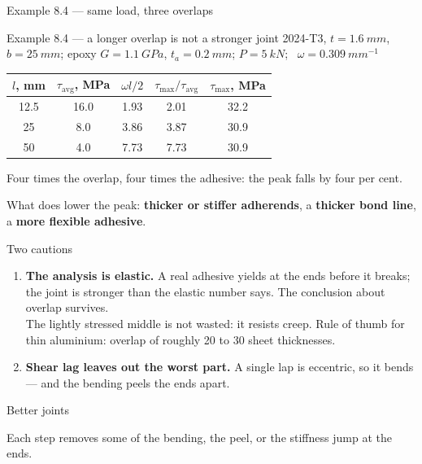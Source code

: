 \documentclass[aspectratio=169,10pt]{beamer}
\begin{document}
\begin{frame}{Example 8.4 --- same load, three overlaps}
\centering
\resizebox{!}{0.8\textheight}{}
\end{frame}

\begin{frame}{Example 8.4 --- a longer overlap is not a stronger joint}
\small 2024-T3, $t=\SI{1.6}{mm}$, $b=\SI{25}{mm}$; epoxy $G=\SI{1.1}{GPa}$, $t_a=\SI{0.2}{mm}$; $P=\SI{5}{kN}$; \ $\omega=\SI{0.309}{mm^{-1}}$

\medskip
\centering\normalsize
\begin{tabular}{@{}ccccc@{}}
\toprule
$l$, mm & $\tau_{\text{avg}}$, MPa & $\omega l/2$ & $\tau_{\max}/\tau_{\text{avg}}$ & $\tau_{\max}$, MPa\\
\midrule
12.5 & 16.0 & 1.93 & 2.01 & 32.2\\
25 & 8.0 & 3.86 & 3.87 & 30.9\\
50 & 4.0 & 7.73 & 7.73 & 30.9\\
\bottomrule
\end{tabular}

\vfill
\raggedright
Four times the overlap, four times the adhesive: the peak falls by \alert{four per cent}.

\medskip
What does lower the peak: \textbf{thicker or stiffer adherends}, a \textbf{thicker bond line}, a
\textbf{more flexible adhesive}.
\end{frame}

\begin{frame}{Two cautions}
\begin{enumerate}
  \item \textbf{The analysis is elastic.} A real adhesive yields at the ends before it breaks; the
        joint is stronger than the elastic number says. The conclusion about overlap survives.\\[3pt]
        The lightly stressed middle is not wasted: it resists creep. Rule of thumb for thin
        aluminium: overlap of roughly 20 to 30 sheet thicknesses.
  \item \textbf{Shear lag leaves out the worst part.} A single lap is eccentric, so it bends ---
        and the bending \alert{peels} the ends apart.
\end{enumerate}
\end{frame}

\begin{frame}{Better joints}
\centering
\resizebox{!}{0.72\textheight}{}

\medskip
\small Each step removes some of the bending, the peel, or the stiffness jump at the ends.
\end{frame}
\end{document}
